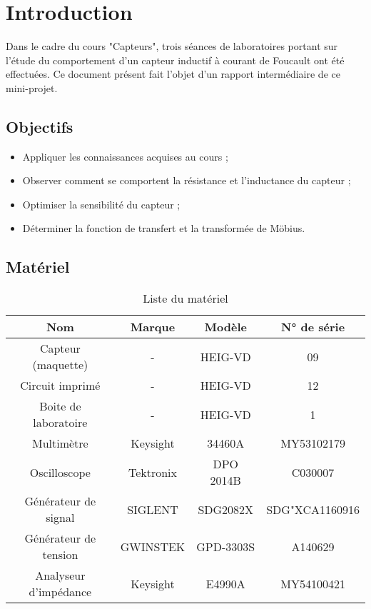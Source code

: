 

\section{Introduction}

Dans le cadre du cours "Capteurs", trois séances de laboratoires portant
sur l'étude du comportement d'un capteur inductif à courant de Foucault ont été effectuées. 
Ce document présent fait l'objet d'un rapport intermédiaire de ce mini-projet.

\subsection{Objectifs}

\begin{itemize}
    \item Appliquer les connaissances acquises au cours ;
    \item Observer comment se comportent la résistance et l'inductance du capteur ;
    \item Optimiser la sensibilité du capteur ;
    \item Déterminer la fonction de transfert et la transformée de Möbius. 
\end{itemize}

\subsection{Matériel}

\begin{table}[H]
    \centering
    \begin{tabular}{|c|c|c|c|}
    \hline
    \textbf{Nom}          & \textbf{Marque} & \textbf{Modèle} & \textbf{N° de série} \\ \hline
    Capteur (maquette)    & -               & HEIG-VD         & 09                   \\ \hline
    Circuit imprimé       & -               & HEIG-VD         & 12                   \\ \hline
    Boite de laboratoire  & -               & HEIG-VD         & 1                    \\ \hline
    Multimètre            & Keysight        & 34460A          & MY53102179           \\ \hline
    Oscilloscope          & Tektronix       & DPO 2014B       & C030007              \\ \hline
    Générateur de signal  & SIGLENT         & SDG2082X        & SDG"XCA1160916       \\ \hline
    Générateur de tension & GWINSTEK        & GPD-3303S       & A140629              \\ \hline
    Analyseur d'impédance & Keysight        & E4990A          & MY54100421           \\ \hline
    \end{tabular}
    \caption{Liste du matériel}
    \end{table}





    

